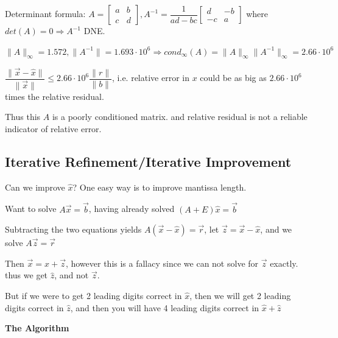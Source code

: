 \documentclass{article}
\begin{document}
\vspace{0.2cm}

Determinant formula: $A = \begin{bmatrix}
a & b\\
c & d
\end{bmatrix}, A^{-1} = \dfrac{1}{ad - bc} \begin{bmatrix}
d & -b\\
-c & a
\end{bmatrix}$ where $det(A) = 0 \Rightarrow A^{-1}$ DNE.

\pagebreak

$\| A \|_{\infty} = 1.572, \| A^{-1} \| = 1.693 \cdot 10^6 \Rightarrow cond_{\infty} (A) = \| A \|_{\infty } \|A^{-1}\|_{\infty} = 2.66 \cdot 10^6$

\vspace{0.2cm}

$\dfrac{\| \vec{x} - \hat{x} \|}{\| \vec{x} \|} \leq 2.66 \cdot 10^6 \dfrac{\| r \|}{\|b \|}$, i.e. relative error in $x$ could be as big as $2.66 \cdot 10^6$ times the relative residual.

Thus this $A$ is a poorly conditioned matrix. and relative residual is not a reliable indicator of relative error.

\vspace{0.2cm}

\subsection{Iterative Refinement/Iterative Improvement}

Can we improve $\hat{x}$? One easy way is to improve mantissa length.

Want to solve $A \vec{x} = \vec{b}$, having already solved $(A + E)\hat{x} = \vec{b}$

Subtracting the two equations yields $A(\vec{x} - \hat{x}) = \vec{r}$, let $\vec{z} = \vec{x} - \hat{x}$, and we solve $A \vec{z} = \vec{r}$

Then $\vec{x} = \hat{x} + \vec{z}$, however this is a fallacy since we can not solve for $\vec{z}$ exactly. thus we get $\hat{z}$, and not $\vec{z}$.

But if we were to get 2 leading digits correct in $\hat{x}$, then we will get 2 leading digits correct in $\hat{z}$, and then you will have 4 leading digits correct in $\hat{x} + \hat{z}$

\vspace{0.2cm}

\textbf{The Algorithm}
\end{document}
